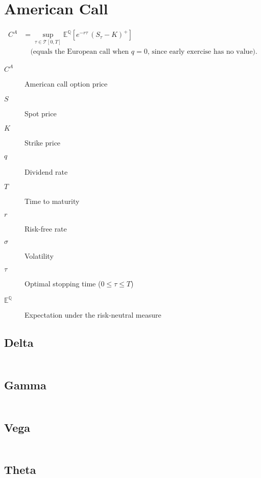 \documentclass[12pt,a4paper]{article}
\begin{document}
\newpage

\section{American Call}

\[
  \begin{aligned}
    C^{A} & = \sup_{\tau \in \mathcal{T}[0,T]} \mathbb{E}^{\mathbb{Q}}\!\left[ e^{-r \tau}\,(S_{\tau}-K)^{+} \right] \\[4pt]
          & \quad \text{(equals the European call when $q=0$, since early exercise has no value).}
  \end{aligned}
\]

\begin{description}
  \item[$C^{A}$] American call option price
  \item[$S$] Spot price
  \item[$K$] Strike price
  \item[$q$] Dividend rate
  \item[$T$] Time to maturity
  \item[$r$] Risk-free rate
  \item[$\sigma$] Volatility
  \item[$\tau$] Optimal stopping time (\( 0 \le \tau \le T \))
  \item[$\mathbb{E}^{\mathbb{Q}}$] Expectation under the risk-neutral measure
\end{description}

\subsection{Delta}
\[
  \begin{aligned}
  \end{aligned}
\]

\subsection{Gamma}
\[
  \begin{aligned}
  \end{aligned}
\]

\subsection{Vega}
\[
  \begin{aligned}
  \end{aligned}
\]

\subsection{Theta}
\[
  \begin{aligned}
  \end{aligned}
\]
\end{document}
